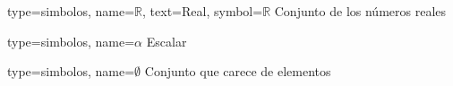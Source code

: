 

{
type={simbolos},
name={$\mathbb{R}$}, %
text={Real}, %
symbol={$\mathbb{R}$} %
}
{Conjunto de los números reales}

{
type={simbolos},
name={$\alpha$}
}
{Escalar}


{
type={simbolos},
name={$\emptyset$}
}
{Conjunto que carece de elementos}


